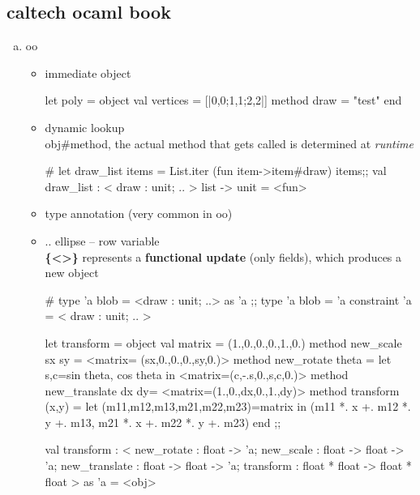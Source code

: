 
\subsection{caltech ocaml book}
\label{sec:caltech-ocaml-book}

\begin{enumerate}[(a)]
\item oo
  \begin{itemize}
  \item immediate object

\begin{redcode}
let poly = object
  val vertices = [|0,0;1,1;2,2|]
  method draw = "test"
end 
\end{redcode}

  \item dynamic lookup \\
    obj\#method, the actual method that gets called is determined
    at \emph{runtime}

\begin{alternate}
# let draw_list items = List.iter (fun item->item#draw) items;;
val draw_list : < draw : unit; .. > list -> unit = <fun>
\end{alternate}

  \item type annotation (very common in oo)
  \item .. ellipse -- row variable \\
    \textbf{ \{<>\} }represents a \textbf{functional update} (only fields),
    which produces a new object
    

\begin{alternate}
# type 'a blob = <draw : unit; ..> as 'a ;;
type 'a blob = 'a constraint 'a = < draw : unit; .. >
\end{alternate}

\begin{redcode}
let transform = 
    object 
      val matrix = (1.,0.,0.,0.,1.,0.)
      method new_scale sx sy =
        {<matrix= (sx,0.,0.,0.,sy,0.)>}
      method new_rotate theta = 
        let s,c=sin theta, cos theta in 
        {<matrix=(c,-.s,0.,s,c,0.)>}
      method new_translate dx dy=
        {<matrix=(1.,0.,dx,0.,1.,dy)>}
      method transform (x,y) = 
        let (m11,m12,m13,m21,m22,m23)=matrix in 
        (m11 *. x +. m12 *. y +. m13,
         m21 *. x +. m22 *. y +. m23)
    end ;;
\end{redcode}

\begin{bluecode}  
  val transform :
  < new_rotate : float -> 'a; new_scale : float -> float -> 'a;
    new_translate : float -> float -> 'a;
    transform : float * float -> float * float >
  as 'a = <obj>
\end{bluecode}




\end{itemize}
\end{enumerate}
